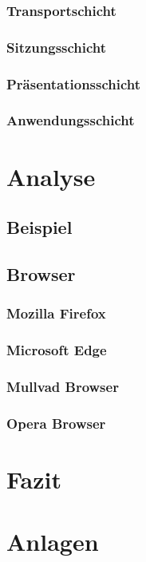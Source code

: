 \documentclass[12pt]{article}
\begin{document}
 \subsubsection{Transportschicht}
 \subsubsection{Sitzungsschicht}
 \subsubsection{Präsentationsschicht}
 \subsubsection{Anwendungsschicht}

\section{Analyse}
\subsection{Beispiel}
\subsection{Browser}
\subsubsection{Mozilla Firefox}
\subsubsection{Microsoft Edge}
 \subsubsection{Mullvad Browser}
\subsubsection{Opera Browser}




 \section{Fazit}


\newpage
 \listoffigures
\newpage



\newpage

\centering
\vspace*{200pt}
\Huge{\section{Anlagen}}
\end{document}
